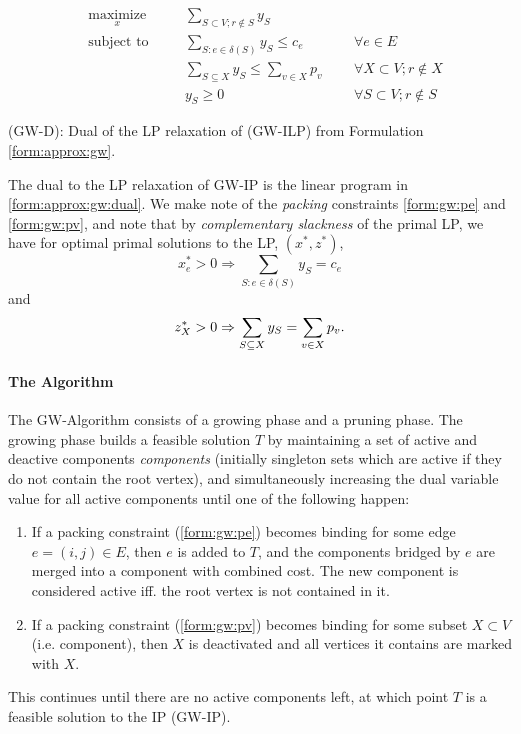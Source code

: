  \begin{formulation}[h!]
   \begin{subequations}
     \begin{alignat}{3} 
       &\underset{x}{\text{maximize}}
       & & \sum_{S \subset V; r \not\in S} y_S & \\
       & \text{subject to}\quad
       & & \sum_{S: e \in \delta(S)} y_S \leq c_e \qquad&& \forall e \in E \label{form:gw:pe}\\
       &&& \sum_{S \subseteq X} y_S \leq \sum_{v \in X} p_v  && \forall X \subset V; r \not\in X \label{form:gw:pv} \\
       &&& y_S \geq 0  && \forall S \subset V; r \not\in S
     \end{alignat}\label{form:approx:gw:dual}
   \end{subequations}
   \caption{(GW-D): Dual of the LP relaxation of (GW-ILP) from Formulation \ref{form:approx:gw}.}
 \end{formulation}
 

 The dual to the LP relaxation of GW-IP is the linear program in \ref{form:approx:gw:dual}. We make note of the
 \textit{packing} constraints \ref{form:gw:pe} and \ref{form:gw:pv}, and note that by \textit{complementary slackness}
 of the primal LP, we have for optimal primal solutions to the LP, $(x^*, z^*)$,
 $$x^*_e > 0 \Rightarrow \sum_{S: e \in \delta(S)} y_S = c_e$$
 and
 $$z^*_X > 0 \Rightarrow \sum_{S \subseteq X} y_S = \sum_{v \in X} p_v\mathnormal{.}$$
 

 
 \paragraph{The Algorithm} The GW-Algorithm consists of a growing phase and a pruning phase. The growing phase
 builds a feasible solution $T$ by maintaining a set of active and deactive components \textit{components}
 (initially singleton sets which are active if they do not contain the root vertex), and simultaneously increasing
  the dual variable value for all active components until one of the following happen:
 \begin{enumerate}[label=\alph*)]
 \item If a packing constraint (\ref{form:gw:pe}) becomes binding for some edge $e = (i,j) \in E$, then $e$ is added
   to $T$, and the components bridged by $e$ are merged into a component with combined cost.
   The new component is considered active iff. the root vertex is not contained in it.
 \item If a packing constraint (\ref{form:gw:pv}) becomes binding for some subset $X  \subset V$ (i.e. component), then $X$ is deactivated
    and all vertices it contains are marked with $X$.
 \end{enumerate}
 This continues until there are no active components left, at which point $T$ is a feasible solution to the IP (GW-IP).

